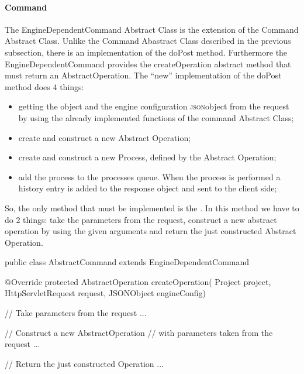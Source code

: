 \paragraph{Command} The EngineDependentCommand Abstract Class is the extension of the Command Abstract Class. Unlike the Command Abastract Class described in the previous subsection, there is an implementation of the doPost method. Furthermore the EngineDependentCommand provides the createOperation abstract method that must return an AbstractOperation. The ``new'' implementation of the doPost method does 4 things:
\begin{itemize}
   \item getting the  object and the engine configuration \textsc{json}object from the request by using the already implemented functions of the command Abstract Class;
   \item create and construct a new Abstract Operation;
   \item create and construct a new Process, defined by the Abstract Operation;
   \item add the process to the processes queue. When the process is performed a history entry is added to the response object and sent to the client side;
\end{itemize}
So, the only method that must be implemented is the . In this method we have to do 2 things: take the parameters from the request, construct a new abstract operation by using the given arguments and return the just constructed Abstract Operation.
\begin{code}
public class AbstractCommand extends EngineDependentCommand {
   @Override
   protected AbstractOperation createOperation(
         Project project,
         HttpServletRequest request,
         JSONObject engineConfig) {

      // Take parameters from the request
      ...
      
      // Construct a new AbstractOperation 
      // with parameters taken from the request
      ...

      // Return the just constructed Operation
      ...
      }
}
\end{code}

